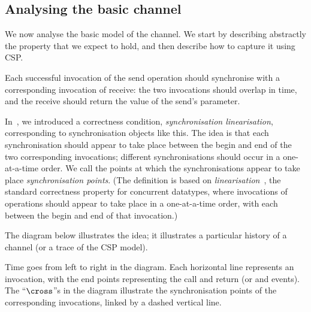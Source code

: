 
\subsection{Analysing the basic channel}
\label{sec:syncchan-analysis-1}

We now analyse the basic model of the channel.  We start by describing
abstractly the property that we expect to hold, and then describe how to
capture it using CSP.

Each successful invocation of the send operation should synchronise with a
corresponding invocation of receive: the two invocations should overlap in
time, and the receive should return the value of the send's parameter.

In~\cite{LL:synchronisation}, we introduced a correctness condition,
\emph{synchronisation linearisation}, corresponding to synchronisation objects
like this.  The idea is that each synchronisation should appear to take place
between the begin and end of the two corresponding invocations; different
synchronisations should occur in a one-at-a-time order.  We call the points at
which the synchronisations appear to take place \emph{synchronisation points}.
(The definition is based on \emph{linearisation}~\cite{herlihy-wing}, the
standard correctness property for concurrent datatypes, where invocations of
operations should appear to take place in a one-at-a-time order, with each
between the begin and end of that invocation.)

The diagram below illustrates the idea; it illustrates a particular history
of a channel (or a trace of the CSP model).
%
\begin{center}
\unScalaMid
{}
\scalaMid
\end{center}
%
Time goes from left to right in the diagram.  Each horizontal line represents
an invocation, with the end points representing the call and return (or
 and  events).  The ``$\cross$''s in the diagram
illustrate the synchronisation points of the corresponding invocations, linked
by a dashed vertical line.

